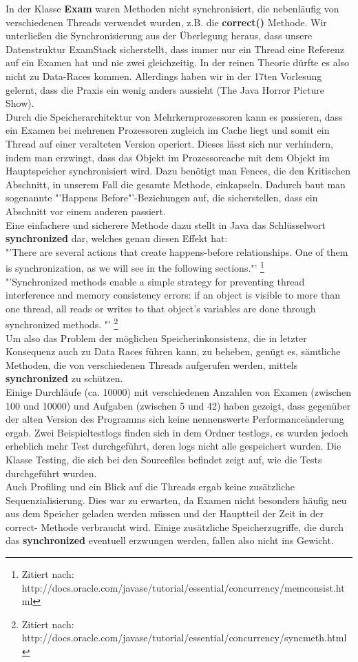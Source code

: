\documentclass[12pt,a4paper]{article}
\begin{document}
In der Klasse \textbf{Exam} waren Methoden nicht synchronisiert, die nebenläufig von verschiedenen Threads verwendet wurden, z.B. die \textbf{correct()} Methode. Wir unterließen die Synchronisierung aus der Überlegung heraus, dass unsere Datenstruktur ExamStack sicherstellt, dass immer nur ein Thread eine Referenz auf ein Examen hat und nie zwei gleichzeitig. In der reinen Theorie dürfte es also nicht zu Data-Races kommen. Allerdings haben wir in der 17ten Vorlesung gelernt, dass die Praxis ein wenig anders aussieht (The Java Horror Picture Show). \\Durch die Speicherarchitektur von Mehrkernprozessoren kann es passieren, dass ein Examen bei mehrenen Prozessoren zugleich im Cache liegt und somit ein Thread auf einer veralteten Version operiert. Dieses lässt sich nur verhindern, indem man erzwingt, dass das Objekt im Prozessorcache mit dem Objekt im Hauptspeicher synchronisiert wird. Dazu benötigt man Fences, die den Kritischen Abschnitt, in unserem Fall die gesamte Methode, einkapseln. Dadurch baut man sogenannte "'Happens Before"'-Beziehungen  auf, die sicherstellen, dass ein Abschnitt vor einem anderen passiert.
\\ Eine einfachere und sicherere Methode dazu stellt in Java das Schlüsselwort \textbf{synchronized} dar, welches genau diesen Effekt hat:\\ "'There are several actions that create happens-before relationships. One of them is synchronization, as we will see in the following sections."' \footnote{Zitiert nach: http://docs.oracle.com/javase/tutorial/essential/concurrency/memconsist.html}
\\
"'Synchronized methods enable a simple strategy for preventing thread interference and memory consistency errors: if an object is visible to more than one thread, all reads or writes to that object's variables are done through synchronized methods. "' \footnote{Zitiert nach: http://docs.oracle.com/javase/tutorial/essential/concurrency/syncmeth.html}
\\Um also das Problem der möglichen Speicherinkonsistenz, die in letzter Konsequenz auch zu Data Races führen kann, zu beheben, genügt es, sämtliche Methoden, die von verschiedenen Threads aufgerufen werden, mittels \textbf{synchronized} zu schützen.\\
Einige Durchläufe (ca. 10000) mit verschiedenen Anzahlen von Examen (zwischen 100 und 10000) und Aufgaben (zwischen 5 und 42) haben gezeigt, dass gegenüber der alten Version des Programms sich keine nennenswerte Performanceänderung ergab. Zwei Beispieltestlogs finden sich in dem Ordner testlogs, es wurden jedoch erheblich mehr Test durchgeführt, deren logs nicht alle gespeichert wurden. Die Klasse Testing, die sich bei den Sourcefiles befindet zeigt auf, wie die Tests durchgeführt wurden.\\ Auch Profiling und ein Blick auf die Threads ergab keine zusätzliche Sequenzialisierung. Dies war zu erwarten, da Examen nicht besonders häufig neu aus dem Speicher geladen werden müssen und der Hauptteil der Zeit in der correct- Methode  verbraucht wird. Einige zusätzliche Speicherzugriffe, die durch das \textbf{synchronized} eventuell erzwungen werden, fallen also nicht ins Gewicht.
\end{document}

